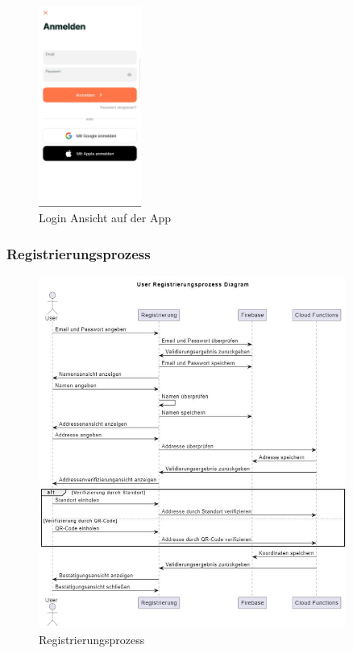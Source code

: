 \begin{figure}[H]
  \centering
  \includegraphics[width=0.3\textwidth]{pics/login-page.jpg}
  \caption{Login Ansicht auf der App}
  \label{fig:login-page}
\end{figure}

\subsubsection{Registrierungsprozess}

\begin{figure}[H]
  \centering
  \includegraphics[width=0.9\textwidth]{pics/registration-sequence.JPG}
  \caption{Registrierungsprozess}
  \label{fig:registration-sequenze}
\end{figure}

